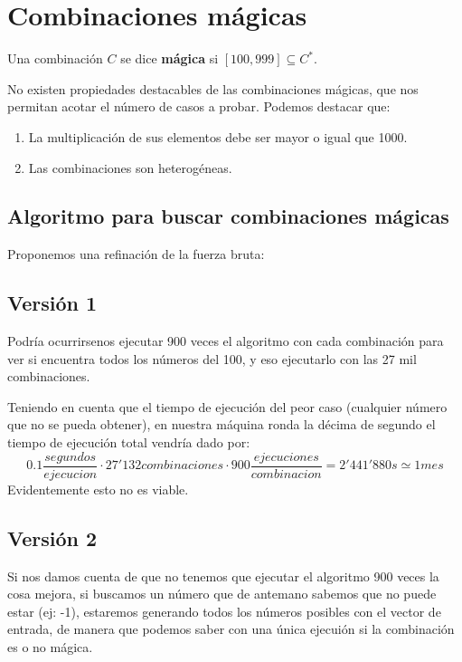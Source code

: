 \section{Combinaciones mágicas}

\begin{definition}
  Una combinación $C$ se dice \textbf{mágica} si $[100,999] \subseteq C^{\ast}$.
\end{definition}

No existen propiedades destacables de las combinaciones mágicas, que nos permitan
acotar el número de casos a probar. Podemos destacar que:
\begin{enumerate}
\item La multiplicación de sus elementos debe ser mayor o igual que 1000. %
\item Las combinaciones son heterogéneas. %
\end{enumerate}

\subsection{Algoritmo para buscar combinaciones mágicas}

Proponemos una refinación de la fuerza bruta:

\subsection{Versión 1}
Podría ocurrirsenos ejecutar 900 veces el algoritmo con cada combinación para
ver si encuentra todos los números del 100, y eso ejecutarlo con las 27 mil
combinaciones.

Teniendo en cuenta que el tiempo de ejecución del peor caso (cualquier número
que no se pueda obtener), en nuestra máquina ronda la décima de segundo el %
tiempo de ejecución total vendría dado por:
$$ 0.1\frac{segundos}{ejecucion} \cdot 27'132 combinaciones  \cdot 900 \frac{ejecuciones}{combinacion}=2'441'880s \simeq 1 mes$$
Evidentemente esto no es viable.

\subsection{Versión 2}
Si nos damos cuenta de que no tenemos que ejecutar el algoritmo 900 veces la
cosa mejora, si buscamos un número que de antemano sabemos que no puede estar
(ej: -1), estaremos generando todos los números posibles con el vector de
entrada, de manera que podemos saber con una única ejecuión si la
combinación es o no mágica.

